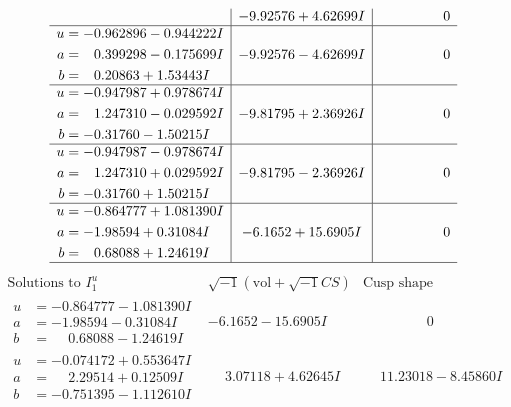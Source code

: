\documentclass[1p]{elsarticle_modified}
\theoremstyle{definition}
\newcommand{\I}{\sqrt{-1}}
\begin{document}
$$\begin{array}{c|c|c}
 & -9.92576 + 4.62699 I & \phantom{-0.000000 } 0 \\ \hline\begin{aligned}
u &= -0.962896 - 0.944222 I \\
a &= \phantom{-}0.399298 - 0.175699 I \\
b &= \phantom{-}0.20863 + 1.53443 I\end{aligned}
 & -9.92576 - 4.62699 I & \phantom{-0.000000 } 0 \\ \hline\begin{aligned}
u &= -0.947987 + 0.978674 I \\
a &= \phantom{-}1.247310 - 0.029592 I \\
b &= -0.31760 - 1.50215 I\end{aligned}
 & -9.81795 + 2.36926 I & \phantom{-0.000000 } 0 \\ \hline\begin{aligned}
u &= -0.947987 - 0.978674 I \\
a &= \phantom{-}1.247310 + 0.029592 I \\
b &= -0.31760 + 1.50215 I\end{aligned}
 & -9.81795 - 2.36926 I & \phantom{-0.000000 } 0 \\ \hline\begin{aligned}
u &= -0.864777 + 1.081390 I \\
a &= -1.98594 + 0.31084 I \\
b &= \phantom{-}0.68088 + 1.24619 I\end{aligned}
 & -6.1652 + 15.6905 I & \phantom{-0.000000 } 0\\
 \hline 
 \end{array}$$\newpage$$\begin{array}{c|c|c}  
\text{Solutions to }I^u_{1}& \I (\text{vol} + \sqrt{-1}CS) & \text{Cusp shape}\\
 \hline 
\begin{aligned}
u &= -0.864777 - 1.081390 I \\
a &= -1.98594 - 0.31084 I \\
b &= \phantom{-}0.68088 - 1.24619 I\end{aligned}
 & -6.1652 - 15.6905 I & \phantom{-0.000000 } 0 \\ \hline\begin{aligned}
u &= -0.074172 + 0.553647 I \\
a &= \phantom{-}2.29514 + 0.12509 I \\
b &= -0.751395 - 1.112610 I\end{aligned}
 & \phantom{-}3.07118 + 4.62645 I & \phantom{-}11.23018 - 8.45860 I \\ \hline\begin{aligned}

\end{aligned}
\end{array}$$
\end{document}
